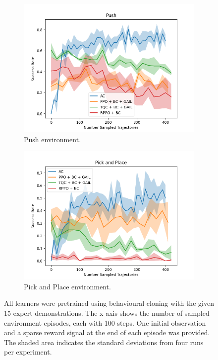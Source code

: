 \begin{figure}[htbp]
\begin{subfigure}[b]{0.45\textwidth}
      \includegraphics[width=\textwidth]{images/15_400/Push.png}
      \caption{Push environment.}
      \label{fig:plot3}
    \end{subfigure}
    \hfill
    \begin{subfigure}[b]{0.45\textwidth}
      \includegraphics[width=\textwidth]{images/15_400/Pick and Place.png}
      \caption{Pick and Place environment.}
      \label{fig:plot4}
    \end{subfigure}
    \caption{All learners were pretrained using behavioural cloning with the given 15 expert demonstrations. 
    The x-axis shows the number of sampled environment episodes, each with 100 steps.  One initial observation and a sparse reward signal at the end of each episode was provided. 
    The shaded area indicates the standard deviations from four runs per experiment.}
    \label{fig:4}
\end{figure}

